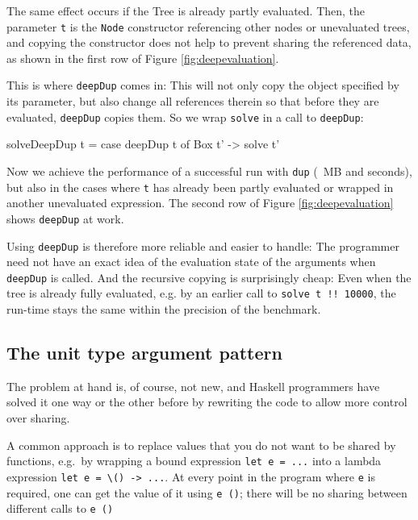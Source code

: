 \documentclass[preprint]{sigplanconf}
\theoremstyle{nonumberplain}
\newcommand{\li}{\lstinline[style=Haskell]}
\begin{document}
The same effect occurs if the Tree is already partly evaluated. Then, the parameter \li-t- is the \li-Node- constructor referencing other nodes or unevaluated trees, and copying the constructor does not help to prevent sharing the referenced data, as shown in the first row of Figure \ref{fig:deepevaluation}.

This is where \li-deepDup- comes in: This will not only copy the object specified by its parameter, but also change all references therein so that before they are evaluated, \li-deepDup- copies them. So we wrap \li-solve- in a call to \li-deepDup-:
\begin{haskell}
solveDeepDup t = case deepDup t of Box t' -> solve t'
\end{haskell}
Now we achieve the performance of a successful run with \li-dup- (~MB and  seconds), but also in the cases where \li-t- has already been partly evaluated or wrapped in another unevaluated expression. The second row of Figure \ref{fig:deepevaluation} shows \li-deepDup- at work.

Using \li-deepDup- is therefore more reliable and easier to handle: The programmer need not have an exact idea of the evaluation state of the arguments when \li-deepDup- is called. And the recursive copying is surprisingly cheap: Even when the tree is already fully evaluated, e.g. by an earlier call to \li-solve t !! 10000-, the run-time stays the same within the precision of the benchmark.


\subsection{The unit type argument pattern}

The problem at hand is, of course, not new, and Haskell programmers have solved it one way or the other before by rewriting the code to allow more control over sharing.

\label{sec:unit}

A common approach is to replace values that you do not want to be shared by functions, e.g.\ by wrapping a bound expression \li-let e = ...- into a lambda expression \li!let e = \() -> ...!. At every point in the program where \li-e- is required, one can get the value of it using \li-e ()-; there will be no sharing between different calls to \li-e ()-
\end{document}
